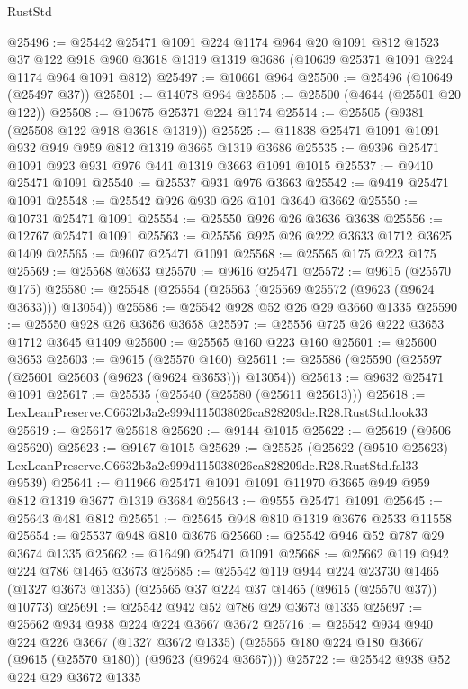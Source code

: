 \begin{lexlean}{RustStd}
\begin{coremodule}
@25496 := @25442
    @25471
    @1091
    @224
    @1174
    @964
    @20
    @1091
    @812
    @1523
    @37
    @122
    @918
    @960
    @3618
    @1319
    @1319
    @3686
    (@10639 @25371 @1091 @224 @1174 @964 @1091 @812)
@25497 := @10661 @964
@25500 := @25496 (@10649 (@25497 @37))
@25501 := @14078 @964
@25505 := @25500 (@4644 (@25501 @20 @122))
@25508 := @10675 @25371 @224 @1174
@25514 := @25505 (@9381 (@25508 @122 @918 @3618 @1319))
@25525 := @11838 @25471 @1091 @1091 @932 @949 @959 @812 @1319 @3665 @1319 @3686
@25535 := @9396 @25471 @1091 @923 @931 @976 @441 @1319 @3663 @1091 @1015
@25537 := @9410 @25471 @1091
@25540 := @25537 @931 @976 @3663
@25542 := @9419 @25471 @1091
@25548 := @25542 @926 @930 @26 @101 @3640 @3662
@25550 := @10731 @25471 @1091
@25554 := @25550 @926 @26 @3636 @3638
@25556 := @12767 @25471 @1091
@25563 := @25556 @925 @26 @222 @3633 @1712 @3625 @1409
@25565 := @9607 @25471 @1091
@25568 := @25565 @175 @223 @175
@25569 := @25568 @3633
@25570 := @9616 @25471
@25572 := @9615 (@25570 @175)
@25580 := @25548 (@25554 (@25563 (@25569 @25572 (@9623 (@9624 @3633))) @13054))
@25586 := @25542 @928 @52 @26 @29 @3660 @1335
@25590 := @25550 @928 @26 @3656 @3658
@25597 := @25556 @725 @26 @222 @3653 @1712 @3645 @1409
@25600 := @25565 @160 @223 @160
@25601 := @25600 @3653
@25603 := @9615 (@25570 @160)
@25611 := @25586 (@25590 (@25597 (@25601 @25603 (@9623 (@9624 @3653))) @13054))
@25613 := @9632 @25471 @1091
@25617 := @25535 (@25540 (@25580 (@25611 @25613)))
@25618 := LexLeanPreserve.C6632b3a2e999d115038026ca828209de.R28.RustStd.look33
@25619 := @25617 @25618
@25620 := @9144 @1015
@25622 := @25619 (@9506 @25620)
@25623 := @9167 @1015
@25629 := @25525
    (@25622
      (@9510 @25623)
      LexLeanPreserve.C6632b3a2e999d115038026ca828209de.R28.RustStd.fal33
      @9539)
@25641 := @11966 @25471 @1091 @1091 @11970 @3665 @949 @959 @812 @1319 @3677 @1319 @3684
@25643 := @9555 @25471 @1091
@25645 := @25643 @481 @812
@25651 := @25645 @948 @810 @1319 @3676 @2533 @11558
@25654 := @25537 @948 @810 @3676
@25660 := @25542 @946 @52 @787 @29 @3674 @1335
@25662 := @16490 @25471 @1091
@25668 := @25662 @119 @942 @224 @786 @1465 @3673
@25685 := @25542
    @119
    @944
    @224
    @23730
    @1465
    (@1327 @3673 @1335)
    (@25565 @37 @224 @37 @1465 (@9615 (@25570 @37)) @10773)
@25691 := @25542 @942 @52 @786 @29 @3673 @1335
@25697 := @25662 @934 @938 @224 @224 @3667 @3672
@25716 := @25542
    @934
    @940
    @224
    @226
    @3667
    (@1327 @3672 @1335)
    (@25565 @180 @224 @180 @3667 (@9615 (@25570 @180)) (@9623 (@9624 @3667)))
@25722 := @25542 @938 @52 @224 @29 @3672 @1335

\end{coremodule}
\end{lexlean}
